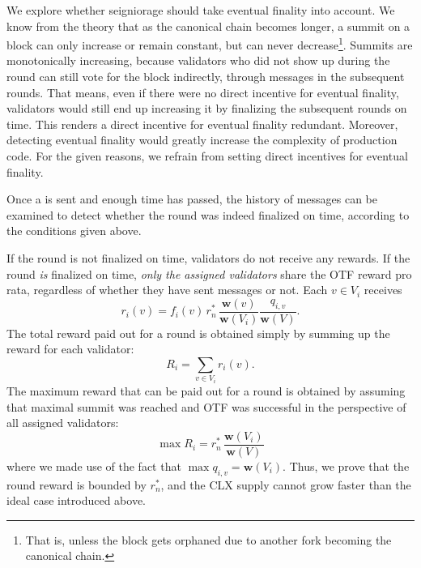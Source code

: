 We explore whether seigniorage should take eventual finality into account. We know from the theory that as the canonical chain becomes longer, a summit on a block can only increase or remain constant, but can never decrease\footnote{That is, unless the block gets orphaned due to another fork becoming the canonical chain.}. Summits are monotonically increasing, because validators who did not show up during the round can still vote for the block indirectly, through messages in the subsequent rounds. That means, even if there were no direct incentive for eventual finality, validators would still end up increasing it by finalizing the subsequent rounds on time. This renders a direct incentive for eventual finality redundant. Moreover, detecting eventual finality would greatly increase the complexity of production code. For the given reasons, we refrain from setting direct incentives for eventual finality.

Once a \PROP is sent and enough time has passed, the history of messages can be examined to detect whether the round was indeed finalized on time, according to the conditions given above.

If the round is not finalized on time, validators do not receive any rewards. If the round \emph{is} finalized on time, \emph{only the assigned validators} share the OTF reward pro rata, regardless of whether they have sent messages or not. Each $v\in V_i$ receives
%
\begin{equation}
  r_i(v) = f_i(v) \, r^\ast_n \,
  \frac{\boldsymbol{w}(v)}{\boldsymbol{w}(V_i)}
  \frac{q_{i,v}}{\boldsymbol{w}(V)}
  .
\end{equation}
%
The total reward paid out for a round is obtained simply by summing up the reward for each validator:
%
\begin{equation}
  R_i = \sum_{v\in V_i} r_i(v)
  .
\end{equation}
%
The maximum reward that can be paid out for a round is obtained by assuming that maximal summit was reached and OTF was successful in the perspective of all assigned validators:
%
\begin{equation}
  \max R_i = r^\ast_n \,
  \frac{\boldsymbol{w}(V_i)}{\boldsymbol{w}(V)}
\end{equation}
%
where we made use of the fact that $\max q_{i,v} = \boldsymbol{w}(V_i)$. Thus, we prove that the round reward is bounded by $r^\ast_n$, and the CLX supply cannot grow faster than the ideal case introduced above.

